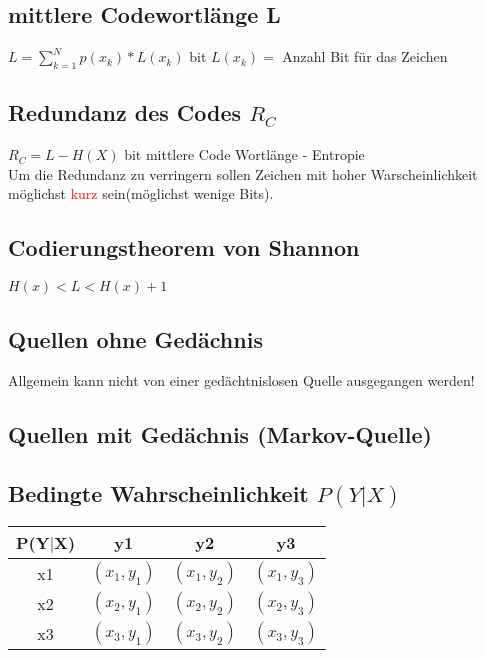 \subsection{mittlere Codewortlänge L}
\colorbox{lightlightgrey}{$L = \sum_{k = 1}^{N}p(x_k) * L(x_k)$ bit} $L(x_k) =$ Anzahl Bit für das Zeichen


\subsection{Redundanz des Codes $R_C$}
\colorbox{lightlightgrey}{$R_C = L - H(X)$ bit} mittlere Code Wortlänge - Entropie\\
Um die Redundanz zu verringern sollen Zeichen mit hoher Warscheinlichkeit möglichst \textcolor{red}{kurz} sein(möglichst wenige Bits).


\subsection{Codierungstheorem von Shannon}
\colorbox{lightlightgrey}{$H(x)<L<H(x) + 1$}

\subsection{Quellen ohne Gedächnis}
Allgemein kann nicht von einer gedächtnislosen Quelle ausgegangen werden!




\subsection{Quellen mit Gedächnis (Markov-Quelle)}
\subsection{Bedingte Wahrscheinlichkeit $P(Y|X)$}
\begin{center}
\begin{tabular}{ |c|c|c|c| }
    \hline
    P(Y$|$X) & y1 & y2 & y3\\
    \hline
    x1 & $(x_1,y_1)$ & $(x_1,y_2)$ & $(x_1,y_3)$\\
    \hline
    x2 & $(x_2,y_1)$ & $(x_2,y_2)$ & $(x_2,y_3)$\\
    \hline
    x3 & $(x_3,y_1)$ & $(x_3,y_2)$ & $(x_3,y_3)$ \\
    \hline
\end{tabular}
\end{center}

